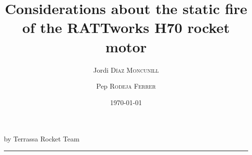 \documentclass[paper=a4, fontsize=11pt]{scrartcl}
\title{Considerations about the static fire of the RATTworks H70 rocket motor} %
\author{Jordi \textsc{Díaz Moncunill} \and Pep \textsc{Rodeja Ferrer}} %
\date{\today} %
\newcommand{\horrule}[1]{\rule{\linewidth}{#1}}   %
\begin{document}
\maketitle %
\begin{center}
  \LARGE{by Terrassa Rocket Team}
\end{center}
\horrule{0.5pt}









\printbibliography
\end{document}
